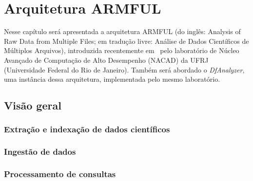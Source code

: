 
\chapter{Arquitetura ARMFUL}%
\label{chap:arquitetura-armful}

Nesse capítulo será apresentada a arquitetura  ARMFUL (do inglês: Analysis of Raw Data from Multiple Files; em tradução livre: Análise de Dados Científicos de Múltiplos Arquivos), introduzida recentemente em~\cite{silva2016situ,silva2017raw} pelo laboratório de  Núcleo Avançado de Computação de Alto Desempenho (NACAD) da  UFRJ (Universidade Federal do Rio de Janeiro). Também será abordado o \textit{DfAnalyzer}, uma instância dessa arquitetura, implementada pelo mesmo laboratório.

\section{Visão geral}



\subsection{Extração e indexação de dados científicos}


\subsection{Ingestão de dados}


\subsection{Processamento de consultas}

